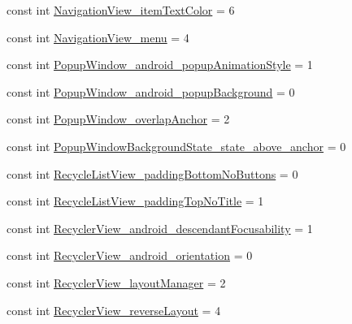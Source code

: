 \begin{DoxyCompactItemize}
const int \mbox{\hyperlink{class_f_w_p_s___app_1_1_droid_1_1_resource_1_1_styleable_a452e52cc71369ecfaac13965c50031d8}{Navigation\+View\+\_\+item\+Text\+Color}} = 6
\item 
const int \mbox{\hyperlink{class_f_w_p_s___app_1_1_droid_1_1_resource_1_1_styleable_aeb49215108afd855681f7a44740833c8}{Navigation\+View\+\_\+menu}} = 4
\item 
const int \mbox{\hyperlink{class_f_w_p_s___app_1_1_droid_1_1_resource_1_1_styleable_a38167c3b9fa1b7d7d58a747c7ba1d8cb}{Popup\+Window\+\_\+android\+\_\+popup\+Animation\+Style}} = 1
\item 
const int \mbox{\hyperlink{class_f_w_p_s___app_1_1_droid_1_1_resource_1_1_styleable_aac273161f1b6fd508089f6a9f90c719d}{Popup\+Window\+\_\+android\+\_\+popup\+Background}} = 0
\item 
const int \mbox{\hyperlink{class_f_w_p_s___app_1_1_droid_1_1_resource_1_1_styleable_ae3302e5be3c320cc368168353234e3bc}{Popup\+Window\+\_\+overlap\+Anchor}} = 2
\item 
const int \mbox{\hyperlink{class_f_w_p_s___app_1_1_droid_1_1_resource_1_1_styleable_a19edc2fde905022d90291e22d9989a5f}{Popup\+Window\+Background\+State\+\_\+state\+\_\+above\+\_\+anchor}} = 0
\item 
const int \mbox{\hyperlink{class_f_w_p_s___app_1_1_droid_1_1_resource_1_1_styleable_a5068b5e51546f8b7f545b157e197e4fc}{Recycle\+List\+View\+\_\+padding\+Bottom\+No\+Buttons}} = 0
\item 
const int \mbox{\hyperlink{class_f_w_p_s___app_1_1_droid_1_1_resource_1_1_styleable_a43ce42372c2008edc3c9be5e1dabfa42}{Recycle\+List\+View\+\_\+padding\+Top\+No\+Title}} = 1
\item 
const int \mbox{\hyperlink{class_f_w_p_s___app_1_1_droid_1_1_resource_1_1_styleable_a4a42bd66537fb50bed4c2ffe43f2d0a9}{Recycler\+View\+\_\+android\+\_\+descendant\+Focusability}} = 1
\item 
const int \mbox{\hyperlink{class_f_w_p_s___app_1_1_droid_1_1_resource_1_1_styleable_a1dabcee9609633001024f9843fd2de5a}{Recycler\+View\+\_\+android\+\_\+orientation}} = 0
\item 
const int \mbox{\hyperlink{class_f_w_p_s___app_1_1_droid_1_1_resource_1_1_styleable_a0c9118a3f04436b9726456498965add5}{Recycler\+View\+\_\+layout\+Manager}} = 2
\item 
const int \mbox{\hyperlink{class_f_w_p_s___app_1_1_droid_1_1_resource_1_1_styleable_a19ee59131779af55a123ddb8c7129b89}{Recycler\+View\+\_\+reverse\+Layout}} = 4
\item 

\end{DoxyCompactItemize}

